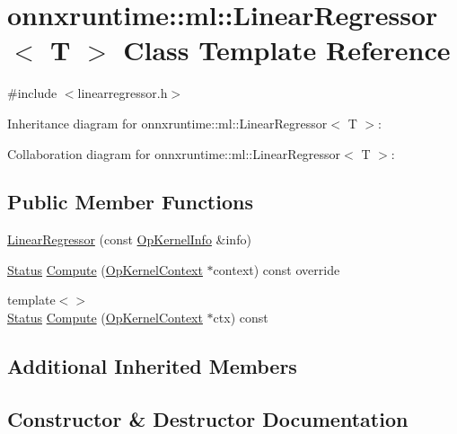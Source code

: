 \hypertarget{classonnxruntime_1_1ml_1_1LinearRegressor}{}\section{onnxruntime\+:\+:ml\+:\+:Linear\+Regressor$<$ T $>$ Class Template Reference}
\label{classonnxruntime_1_1ml_1_1LinearRegressor}


{\ttfamily \#include $<$linearregressor.\+h$>$}



Inheritance diagram for onnxruntime\+:\+:ml\+:\+:Linear\+Regressor$<$ T $>$\+:


Collaboration diagram for onnxruntime\+:\+:ml\+:\+:Linear\+Regressor$<$ T $>$\+:
\subsection*{Public Member Functions}
\begin{DoxyCompactItemize}
\item 
\mbox{\hyperlink{classonnxruntime_1_1ml_1_1LinearRegressor_a3445f6161332213062d8ed3b812a1de3}{Linear\+Regressor}} (const \mbox{\hyperlink{classonnxruntime_1_1OpKernelInfo}{Op\+Kernel\+Info}} \&info)
\item 
\mbox{\hyperlink{classonnxruntime_1_1common_1_1Status}{Status}} \mbox{\hyperlink{classonnxruntime_1_1ml_1_1LinearRegressor_a1766b7b9069ec2da7d24e09acf7f259d}{Compute}} (\mbox{\hyperlink{classonnxruntime_1_1OpKernelContext}{Op\+Kernel\+Context}} $\ast$context) const override
\item 
{\footnotesize template$<$$>$ }\\\mbox{\hyperlink{classonnxruntime_1_1common_1_1Status}{Status}} \mbox{\hyperlink{classonnxruntime_1_1ml_1_1LinearRegressor_a2429a780f50ff633d29ff109b665eeda}{Compute}} (\mbox{\hyperlink{classonnxruntime_1_1OpKernelContext}{Op\+Kernel\+Context}} $\ast$ctx) const
\end{DoxyCompactItemize}
\subsection*{Additional Inherited Members}


\subsection{Constructor \& Destructor Documentation}
\mbox{\label{classonnxruntime_1_1ml_1_1LinearRegressor_a3445f6161332213062d8ed3b812a1de3}} 
